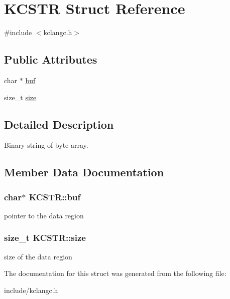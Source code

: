 \hypertarget{structKCSTR}{\section{\-K\-C\-S\-T\-R \-Struct \-Reference}
\label{structKCSTR}
}


{\ttfamily \#include $<$kclangc.\-h$>$}

\subsection*{\-Public \-Attributes}
\begin{DoxyCompactItemize}
\item 
char $\ast$ \hyperlink{structKCSTR_a3cc2ddd4f31e396186c58f4c4af1be95}{buf}
\item 
size\-\_\-t \hyperlink{structKCSTR_ad3cb793e9eaacf8dfec9b8a0c4dfc98c}{size}
\end{DoxyCompactItemize}


\subsection{\-Detailed \-Description}
\-Binary string of byte array. 

\subsection{\-Member \-Data \-Documentation}
\hypertarget{structKCSTR_a3cc2ddd4f31e396186c58f4c4af1be95}{
\subsubsection[{buf}]{\setlength{\rightskip}{0pt plus 5cm}char$\ast$ {\bf \-K\-C\-S\-T\-R\-::buf}}}\label{structKCSTR_a3cc2ddd4f31e396186c58f4c4af1be95}
pointer to the data region \hypertarget{structKCSTR_ad3cb793e9eaacf8dfec9b8a0c4dfc98c}{
\subsubsection[{size}]{\setlength{\rightskip}{0pt plus 5cm}size\-\_\-t {\bf \-K\-C\-S\-T\-R\-::size}}}\label{structKCSTR_ad3cb793e9eaacf8dfec9b8a0c4dfc98c}
size of the data region 

\-The documentation for this struct was generated from the following file\-:\begin{DoxyCompactItemize}
\item 
include/kclangc.\-h\end{DoxyCompactItemize}
